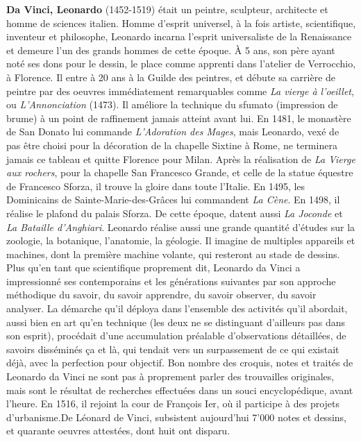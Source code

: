 \textbf{Da Vinci, Leonardo} (1452-1519) était un peintre, sculpteur, architecte et homme de sciences italien. Homme d'esprit universel, à la fois artiste, scientifique, inventeur et philosophe, Leonardo incarna l'esprit universaliste de la Renaissance et demeure l'un des grands hommes de cette époque. À 5 ans, son père ayant noté ses dons pour le dessin, le place comme apprenti dans l'atelier de Verrocchio, à Florence. Il entre à 20 ans à la Guilde des peintres, et débute sa carrière de peintre par des oeuvres immédiatement remarquables comme \textit{La vierge à l'oeillet}, ou \textit{L'Annonciation} (1473). Il améliore la technique du sfumato (impression de brume) à un point de raffinement jamais atteint avant lui. En 1481, le monastère de San Donato lui commande \textit{L'Adoration des Mages}, mais Leonardo, vexé de pas être choisi pour la décoration de la chapelle Sixtine à Rome, ne terminera jamais ce tableau et quitte Florence pour Milan. Après la réalisation de \textit{La Vierge aux rochers}, pour la chapelle San Francesco Grande, et celle de la statue équestre de Francesco Sforza, il trouve la gloire dans toute l'Italie. En 1495, les Dominicains de Sainte-Marie-des-Grâces lui commandent \textit{La Cène}. En 1498, il réalise le plafond du palais Sforza. De cette époque, datent aussi \textit{La Joconde} et \textit{La Bataille d'Anghiari}. Leonardo réalise aussi une grande quantité d'études sur la zoologie, la botanique, l'anatomie, la géologie. Il imagine de multiples appareils et machines, dont la première machine volante, qui resteront au stade de dessins. Plus qu'en tant que scientifique proprement dit, Leonardo da Vinci a impressionné ses contemporains et les générations suivantes par son approche méthodique du savoir, du savoir apprendre, du savoir observer, du savoir analyser. La démarche qu'il déploya dans l'ensemble des activités qu'il abordait, aussi bien en art qu'en technique (les deux ne se distinguant d'ailleurs pas dans son esprit), procédait d'une accumulation préalable d'observations détaillées, de savoirs disséminés ça et là, qui tendait vers un surpassement de ce qui existait déjà, avec la perfection pour objectif. Bon nombre des croquis, notes et traités de Leonardo da Vinci ne sont pas à proprement parler des trouvailles originales, mais sont le résultat de recherches effectuées dans un souci encyclopédique, avant l'heure. En 1516, il rejoint la cour de François Ier, où il participe à des projets d'urbanisme.De Léonard de Vinci, subsistent aujourd'hui 7'000 notes et dessins, et quarante oeuvres attestées, dont huit ont disparu.

